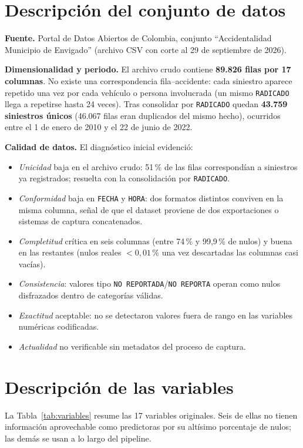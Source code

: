 \documentclass[11pt]{article}
\newcommand{\vartxt}[1]{\texttt{#1}}
\begin{document}
\section{Descripción del conjunto de datos}

\textbf{Fuente.} Portal de Datos Abiertos de Colombia, conjunto ``Accidentalidad Municipio de Envigado'' (archivo CSV con corte al 29 de septiembre de 2026).

\textbf{Dimensionalidad y periodo.} El archivo crudo contiene \textbf{89.826 filas por 17 columnas}. No existe una correspondencia fila--accidente: cada siniestro aparece repetido una vez por cada vehículo o persona involucrada (un mismo \vartxt{RADICADO} llega a repetirse hasta 24 veces). Tras consolidar por \vartxt{RADICADO} quedan \textbf{43.759 siniestros únicos} (46.067 filas eran duplicados del mismo hecho), ocurridos entre el 1 de enero de 2010 y el 22 de junio de 2022.

\textbf{Calidad de datos.} El diagnóstico inicial evidenció:
\begin{itemize}\setlength\itemsep{0.1em}
  \item \emph{Unicidad} baja en el archivo crudo: 51\,\% de las filas correspondían a siniestros ya registrados; resuelta con la consolidación por \vartxt{RADICADO}.
  \item \emph{Conformidad} baja en \vartxt{FECHA} y \vartxt{HORA}: dos formatos distintos conviven en la misma columna, señal de que el dataset proviene de dos exportaciones o sistemas de captura concatenados.
  \item \emph{Completitud} crítica en seis columnas (entre 74\,\% y 99,9\,\% de nulos) y buena en las restantes (nulos reales $<0{,}01$\,\% una vez descartadas las columnas casi vacías).
  \item \emph{Consistencia}: valores tipo \vartxt{NO REPORTADA}/\vartxt{NO REPORTA} operan como nulos disfrazados dentro de categorías válidas.
  \item \emph{Exactitud} aceptable: no se detectaron valores fuera de rango en las variables numéricas codificadas.
  \item \emph{Actualidad} no verificable sin metadatos del proceso de captura.
\end{itemize}

\section{Descripción de las variables}

La Tabla~\ref{tab:variables} resume las 17 variables originales. Seis de ellas no tienen información aprovechable como predictoras por su altísimo porcentaje de nulos; las demás se usan a lo largo del pipeline.
\end{document}
